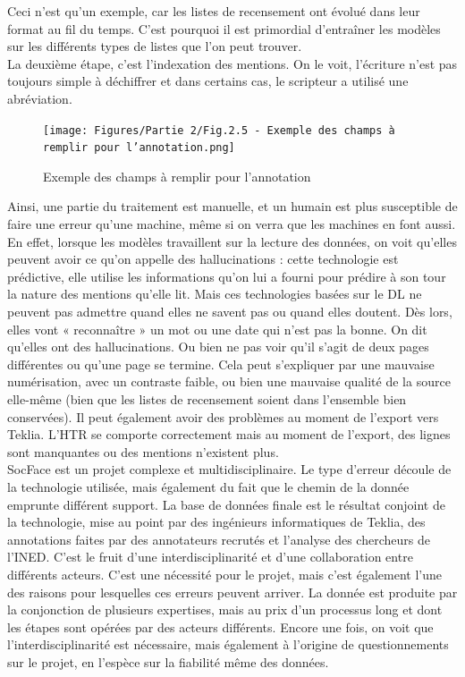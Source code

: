 Ceci n’est qu’un exemple, car les listes de recensement ont évolué dans leur format au fil du temps. C’est pourquoi il est primordial d’entraîner les modèles sur les différents types de listes que l’on peut trouver.\\ 
\clearpage
La deuxième étape, c’est l’indexation des mentions. On le voit, l’écriture n’est pas toujours simple à déchiffrer et dans certains cas, le scripteur a utilisé une abréviation. 
\begin{figure}[H]
        \centering
        \texttt{[image: Figures/Partie 2/Fig.2.5 - Exemple des champs à remplir pour l'annotation.png]}
        \caption{Exemple des champs à remplir pour l'annotation}
        \label{fig:Fig2.5}
    \end{figure}

Ainsi, une partie du traitement est manuelle, et un humain est plus susceptible de faire une erreur qu’une machine, même si on verra que les machines en font aussi. En effet, lorsque les modèles travaillent sur la lecture des données, on voit qu’elles peuvent avoir ce qu’on appelle des hallucinations : cette technologie est prédictive, elle utilise les informations qu’on lui a fourni pour prédire à son tour la nature des mentions qu’elle lit. Mais ces technologies basées sur le \gls{DL} ne peuvent pas admettre quand elles ne savent pas ou quand elles doutent. Dès lors, elles vont « reconnaître » un mot ou une date qui n’est pas la bonne. On dit qu’elles ont des hallucinations. Ou bien ne pas voir qu’il s’agit de deux pages différentes ou qu'une page se termine. Cela peut s’expliquer par une mauvaise numérisation, avec un contraste faible, ou bien une mauvaise qualité de la source elle-même (bien que les listes de recensement soient dans l’ensemble bien conservées). Il peut également avoir des problèmes au moment de l’export \Arkindex{} vers Teklia. L’HTR se comporte correctement mais au moment de l’export, des lignes sont manquantes ou des mentions n’existent plus.\\
SocFace est un projet complexe et multidisciplinaire. Le type d’erreur découle de la technologie utilisée, mais également du fait que le chemin de la donnée emprunte différent support. La base de données finale est le résultat conjoint de la technologie, mise au point par des ingénieurs informatiques de Teklia, des annotations faites par des annotateurs recrutés et l’analyse des chercheurs de l’INED. C’est le fruit d’une interdisciplinarité et d’une collaboration entre différents acteurs. C’est une nécessité pour le projet, mais c’est également l’une des raisons pour lesquelles ces erreurs peuvent arriver. La donnée est produite par la conjonction de plusieurs expertises, mais au prix d’un processus long et dont les étapes sont opérées par des acteurs différents. Encore une fois, on voit que l’interdisciplinarité est nécessaire, mais également à l’origine de questionnements sur le projet, en l’espèce sur la fiabilité même des données. 

